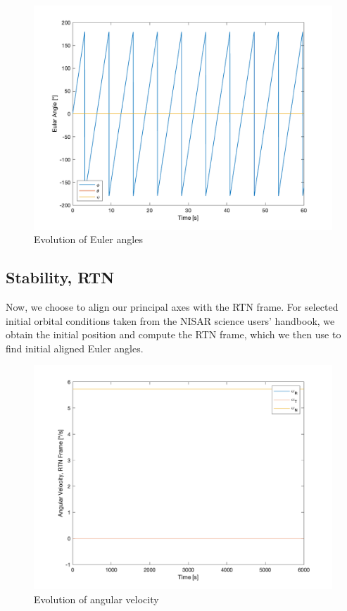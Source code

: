 \begin{figure}[H]
\centering
\includegraphics[scale=0.6]{Images/ps4_problem1a_angle.png}
\caption{Evolution of Euler angles}
\label{fig:ps4_problem1a_angle}
\end{figure}

\subsection{Stability, RTN}
Now, we choose to align our principal axes with the RTN frame. For selected initial orbital conditions taken from the NISAR science users' handbook, we obtain the initial position and compute the RTN frame, which we then use to find initial aligned Euler angles.

\begin{figure}[H]
\centering
\includegraphics[scale=0.6]{Images/ps4_problem1b_angvel.png}
\caption{Evolution of angular velocity}
\label{fig:ps4_problem1b_angvel}
\end{figure}

